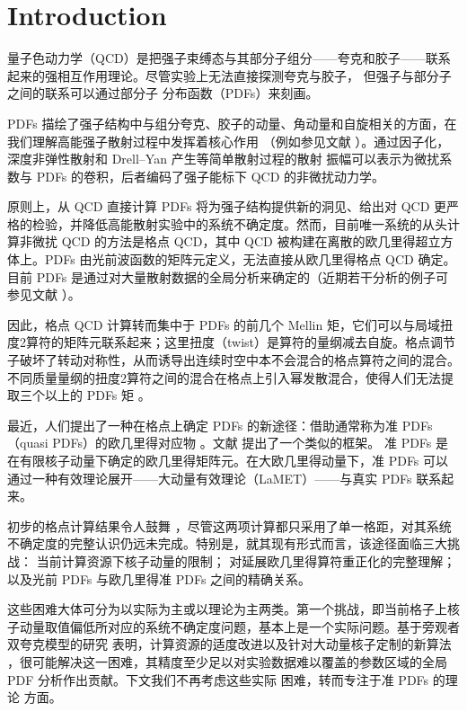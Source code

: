 \section{Introduction}

量子色动力学（QCD）是把强子束缚态与其部分子组分——夸克和胶子——联系起来的强相互作用理论。尽管实验上无法直接探测夸克与胶子，
但强子与部分子之间的联系可以通过部分子
分布函数（PDFs）来刻画。

PDFs 描绘了强子结构中与组分夸克、胶子的动量、角动量和自旋相关的方面，在我们理解高能强子散射过程中发挥着核心作用
（例如参见文献
\cite{Brock:1993sz,Sterman:1994ce,Collins:2011zzd}）。通过因子化，
深度非弹性散射和 Drell--Yan 产生等简单散射过程的散射
振幅可以表示为微扰系数与 PDFs 的卷积，后者编码了强子能标下 QCD 的非微扰动力学。

原则上，从 QCD 直接计算 PDFs 将为强子结构提供新的洞见、给出对 QCD 更严格的检验，并降低高能散射实验中的系统不确定度。然而，目前唯一系统的从头计算非微扰 QCD 的方法是格点 QCD，其中 QCD 被构建在离散的欧几里得超立方体上。PDFs 由光前波函数的矩阵元定义，无法直接从欧几里得格点 QCD 确定。目前 PDFs 是通过对大量散射数据的全局分析来确定的（近期若干分析的例子可参见文献
\cite{Arbabifar:2013tma,Ball:2013lla,Jimenez-Delgado:2013boa,
Jimenez-Delgado:2014xza,Dulat:2015mca,
Hou:2016sho,Shahri:2016uzl}）。

因此，格点 QCD 计算转而集中于 PDFs 的前几个 Mellin 矩，它们可以与局域扭度2算符的矩阵元联系起来；这里扭度（twist）是算符的量纲减去自旋。格点调节子破坏了转动对称性，从而诱导出连续时空中本不会混合的格点算符之间的混合。不同质量量纲的扭度2算符之间的混合在格点上引入幂发散混合，使得人们无法提取三个以上的 PDFs 矩
\cite{Detmold:2001dv,Detmold:2003rq}。

最近，人们提出了一种在格点上确定 PDFs 的新途径：借助通常称为准 PDFs（quasi PDFs）的欧几里得对应物
\cite{Ji:2013dva,Ji:2014gla,Lin:2014zya,Gamberg:2014zwa,Ji:2015jwa,
Alexandrou:2015rja,Chen:2016utp}。文献 \cite{Ma:2014jla} 提出了一个类似的框架。
准 PDFs 是在有限核子动量下确定的欧几里得矩阵元。在大欧几里得动量下，准 PDFs 可以通过一种有效理论展开——大动量有效理论（LaMET）——与真实 PDFs 联系起来。

初步的格点计算结果令人鼓舞
\cite{Lin:2014zya,Alexandrou:2015rja}，尽管这两项计算都只采用了单一格距，对其系统不确定度的完整认识仍远未完成。特别是，就其现有形式而言，该途径面临三大挑战：
当前计算资源下核子动量的限制；
对延展欧几里得算符重正化的完整理解；
以及光前 PDFs 与欧几里得准
PDFs 之间的精确关系。

这些困难大体可分为以实际为主或以理论为主两类。第一个挑战，即当前格子上核子动量取值偏低所对应的系统不确定度问题，基本上是一个实际问题。基于旁观者双夸克模型的研究
\cite{Gamberg:2014zwa} 表明，计算资源的适度改进以及针对大动量核子定制的新算法 \cite{Bali:2016lva}，很可能解决这一困难，其精度至少足以对实验数据难以覆盖的参数区域的全局 PDF 分析作出贡献。下文我们不再考虑这些实际
困难，转而专注于准 PDFs 的理论
方面。

